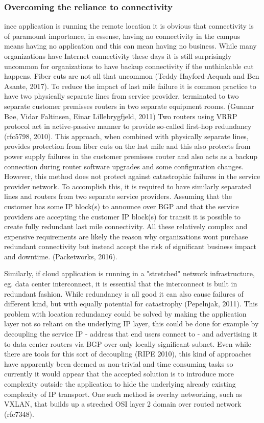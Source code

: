 \documentclass{article}
\begin{document}
\subsubsection{Overcoming the reliance to connectivity}
ince application is running the remote location it is obvious that connectivity is of paramount importance, in essense, having no connectivity in the campus means having no application and this can mean having no business. While many organizations have Internet connectivity these days it is still surprisingly uncommon for organizations to have backup connectivity if the unthinkable cut happens. Fiber cuts are not all that uncommon (Teddy Hayford-Acquah and Ben Asante, 2017).
To reduce the impact of last mile failure it is common practice to have two physically separate lines from service provider, terminated to two separate customer premisses routers in two separate equipment rooms. (Gunnar Bøe, Vidar Faltinsen, Einar Lillebrygfjeld, 2011) Two routers using VRRP protocol act in active-passive manner to provide so-called first-hop redundancy (rfc5798, 2010). This approach, when combined with physically separate lines, provides protection from fiber cuts on the last mile and this also protects from power supply failures in the customer premisses router and also acts as a backup connection during router software upgrades and some configuration changes.
However, this method does not protect against catastrophic failures in the service provider network. To accomplish this, it is required to have similarly separated lines and routers from two separate service providers. Assuming that the customer has some IP block(s) to announce over BGP and that the service providers are accepting the customer IP block(s) for transit it is possible to create fully redundant last mile connectivity. All these relatively complex and expensive requirements are likely the reason why organizations wont purchase redundant connectivity but instead accept the risk of significant business impact and downtime. (Packetworks, 2016).
\par
Similarly, if cloud application is running in a "stretched" network infrastructure, eg. data center interconnect, it is essential that the interconnect is built in redundant fashion. While redundancy is all good it can also cause failures of different kind, but with equally potential for catastrophy (Pepelnjak, 2011).
This problem with location redundancy could be solved by making the application layer not so reliant on the underlying IP layer, this could be done for example by decoupling the service IP - address that end users connect to - and advertising it to data center routers via BGP over only locally significant subnet. Even while there are tools for this sort of decoupling (RIPE 2010), this kind of approaches have apparently been deemed as non-trivial and time consuming tasks so currently it would appear that the accepted solution is to introduce more complexity outside the application to hide the underlying already existing complexity of IP transport. One such method is overlay networking, such as VXLAN, that builds up a streched OSI layer 2 domain over routed network (rfc7348).
\end{document}
